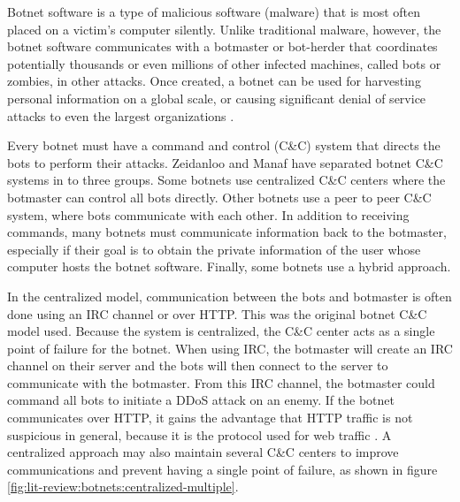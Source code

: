 Botnet software is a type of malicious software (malware) that is most often
placed on a victim's computer silently.  Unlike traditional malware, however,
the botnet software communicates with a botmaster or bot-herder that coordinates
potentially thousands or even millions of other infected machines, called bots or zombies,
in other attacks.  Once created, a botnet can be used for harvesting personal
information on a global scale, or causing significant denial of service attacks
to even the largest organizations \cite{botnet-ecosystem}.

Every botnet must have a command and control (C\&C) system that directs the
bots to perform their attacks.  Zeidanloo and Manaf \cite{botnet-cc-mechanisms} have
separated botnet C\&C systems in to three groups.  Some botnets use centralized C\&C
centers where the botmaster can control all bots directly.  Other botnets use a
peer to peer C\&C system, where bots communicate with each other.  In addition
to receiving commands, many botnets must communicate information back to the
botmaster, especially if their goal is to obtain the private information of the
user whose computer hosts the botnet software.  Finally, some botnets use a
hybrid approach.

In the centralized model, communication between the bots and botmaster is
often done using an IRC channel or over HTTP.  This was the original botnet C\&C
model used.  Because the system is centralized, the C\&C center acts as a single
point of failure for the botnet.  When using IRC, the botmaster will create an
IRC channel on their server and the bots will then connect to the server to
communicate with the botmaster.  From this IRC channel, the botmaster could
command all bots to initiate a DDoS attack on an enemy.  If the botnet
communicates over HTTP, it gains the advantage that HTTP traffic is not
suspicious in general, because it is the protocol used for web traffic
\cite{botnet-cc-mechanisms}.  A centralized approach may also
maintain several C\&C centers to improve communications and prevent having
a single point of failure, as shown in figure
\ref{fig:lit-review:botnets:centralized-multiple}.

